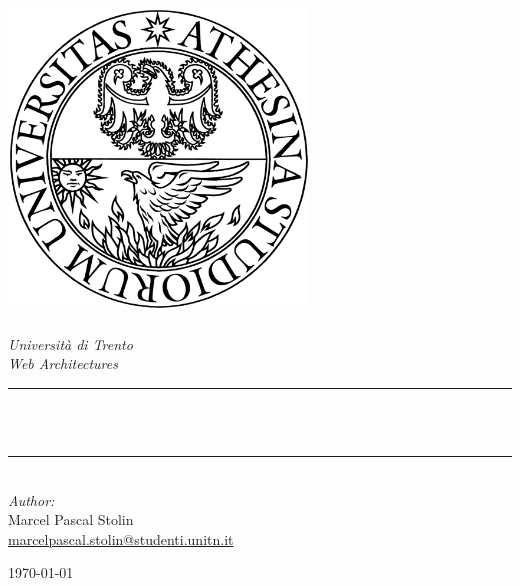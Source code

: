 \begin{titlepage}
\newcommand{\HRule}{\rule{\linewidth}{0.5mm}} 
\center 
\includegraphics[width=8cm]{title/logo.png}\\[1cm]
\quad\\[1.5cm]
\textsl{\Large Universit\`{a} di Trento}\\[0.5cm] 
\textsl{\large Web Architectures}\\[0.5cm] 
\makeatletter
\HRule \\[0.4cm]
{ \huge \bfseries \@title}\\[0.4cm] 
\HRule \\[1.5cm]

\makeatother
{\large \emph{Author:}\\
Marcel Pascal Stolin\\
\href{mailto:marcelpascal.stolin@studenti.unitn.it}{marcelpascal.stolin@studenti.unitn.it}}\\[2cm] 
\vfill 

\makeatother
{\large \today}\\[2cm] 
\vfill 
\end{titlepage}
